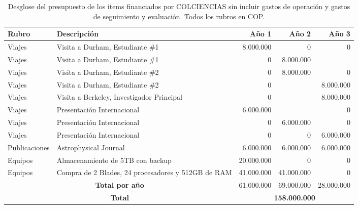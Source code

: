 \begin{table}[h]
\begin{center}
\begin{tabular}{|l|p{5.5cm}|r|r|r|}\hline
{\bf Rubro}	&{\bf Descripción}	& {\bf Año 1}	& {\bf Año 2}	& {\bf Año 3}\\\hline
Viajes	&Visita a Durham, Estudiante \#1	& 8.000.000	&	0&0\\\hline
Viajes	&Visita a Durham, Estudiante \#1	&0	& 8.000.000 &\\\hline
Viajes	&Visita a Durham, Estudiante \#2	&0	&	8.000.000 &0\\\hline
Viajes	&Visita a Durham, Estudiante \#2	&0	&	 & 8.000.000\\\hline
Viajes	&Visita a Berkeley, Investigador Principal	&0	&	 & 8.000.000\\\hline
Viajes	&Presentación Internacional	& 6.000.000	&	&0\\\hline
Viajes	&Presentación Internacional    &0	&6.000.000	&0\\\hline
Viajes	&Presentación Internacional    &0	&0	&6.000.000\\\hline
Publicaciones	&Astrophysical Journal	&6.000.000	& 6.000.000	&6.000.000\\\hline
Equipos	&Almacenamiento de 5TB con backup 	&20.000.000	&0	&0\\\hline
Equipos	&Compra de 2 Blades, 24 procesadores y 512GB de RAM 	&41.000.000	&41.000.000	&0\\\hline
\multicolumn{2}{|c|}{{\bf Total por año}}	 & 61.000.000	&69.000.000	&28.000.000 \\\hline
\multicolumn{2}{|c|}{\bf Total } & \multicolumn{3}{|c|}{{\bf 158.000.000}}\\\hline
\end{tabular} 
\caption{Desglose del presupuesto de los items financiados por COLCIENCIAS sin incluir gastos de 
operaci\'on y gastos de seguimiento y evaluaci\'on. Todos los rubros en COP.}
\end{center}
\label{Resumen Presupuesto Colciencias}
\end{table}


